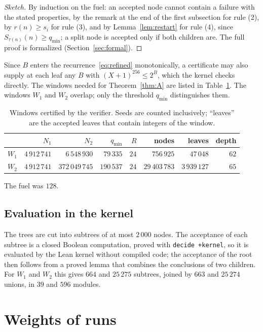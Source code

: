 \documentclass[11pt]{amsart}
\theoremstyle{definition}
\theoremstyle{remark}
\begin{document}
\begin{proof}[Sketch]
By induction on the fuel: an accepted node cannot contain a failure with the stated properties, by the remark at the end of the first subsection for rule (2), by $r(n)\ge s_i$ for rule (3), and by Lemma~\ref{lem:restart} for rule (4), since $S_{\tau(n)}(n)\ge q_{\min}$; a split node is accepted only if both children are. The full proof is formalized (Section~\ref{sec:formal}).
\end{proof}

Since $B$ enters the recurrence~\eqref{eq:refined} monotonically, a certificate may also supply at each leaf any $B$ with $(X+1)^{256}\le2^{B}$, which the kernel checks directly. The windows needed for Theorem~\ref{thm:A} are listed in Table~\ref{tab:windows}. The windows $W_1$ and $W_2$ overlap; only the threshold $q_{\min}$ distinguishes them.

\begin{table}[ht]
\caption{Windows certified by the verifier. Seeds are counted inclusively; ``leaves'' are the accepted leaves that contain integers of the window.}\label{tab:windows}
\small
\begin{tabular}{@{}lrrrrrrr@{}}
\toprule
& $N_1$ & $N_2$ & $q_{\min}$ & $R$ & nodes & leaves & depth \\
\midrule
$W_1$ & $4\,912\,741$ & $6\,548\,930$ & $79\,335$ & $24$ & $756\,925$ & $47\,048$ & $62$ \\
$W_2$ & $4\,912\,741$ & $372\,049\,745$ & $190\,537$ & $24$ & $29\,403\,783$ & $3\,939\,127$ & $65$ \\
\bottomrule
\end{tabular}
\par\smallskip
\raggedright\footnotesize The fuel was $128$.
\end{table}

\subsection{Evaluation in the kernel}
The trees are cut into subtrees of at most $2\,000$ nodes. The acceptance of each subtree is a closed Boolean computation, proved with \texttt{decide +kernel}, so it is evaluated by the Lean kernel without compiled code; the acceptance of the root then follows from a proved lemma that combines the conclusions of two children. For $W_1$ and $W_2$ this gives $664$ and $25\,275$ subtrees, joined by $663$ and $25\,274$ unions, in $39$ and $596$ modules.

\section{Weights of runs}\label{sec:weights}
\end{document}
